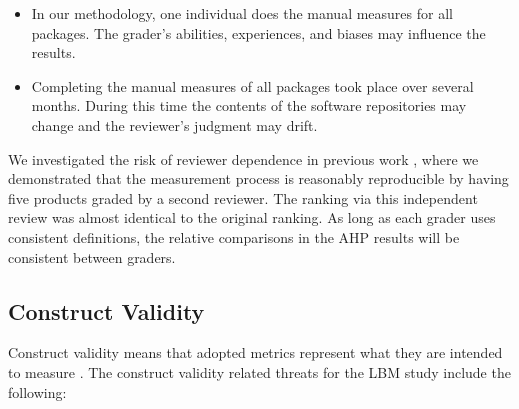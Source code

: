 \documentclass[final, 3p, times, authoryear]{elsarticle}
\begin{document}
\begin{itemize}
\item In our methodology, one individual does the manual measures for all
packages. The grader's abilities, experiences, and biases may influence the
results.  
\item Completing the manual measures of all packages took place over several
months. During this time the contents of the software repositories may change
and the reviewer's judgment may drift.
\end{itemize}

We investigated the risk of reviewer dependence in previous work \citep{SmithEtAl2016}, %
where we demonstrated that the measurement process is
reasonably reproducible by having five products graded by a second reviewer. The
ranking via this independent review was almost identical to the original
ranking. As long as each grader uses consistent definitions, the relative
comparisons in the AHP results will be consistent between graders.

\subsection{Construct Validity}

Construct validity means that adopted metrics represent what they are intended
to measure \citep{RunesonAndHost2009}. The construct validity related threats
for the LBM study include the following:
\end{document}
